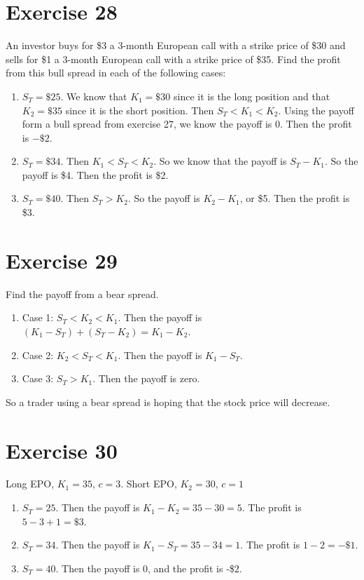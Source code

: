 \documentclass{article}
\begin{document}
\section*{Exercise 28} 
An investor buys for \$3 a 3-month European call with a strike price of \$30 and sells for \$1 a 3-month
European call with a strike price of \$35. Find the profit from this bull spread in each of the following cases:
\begin{enumerate}
    \item $S_T = \$25$. We know that $K_1 = \$30$ since it is the long position and that $K_2 = \$35$ since it is the short position.
    Then $S_T < K_1 < K_2$. Using the payoff form a bull spread from exercise 27, we know the payoff is 0. Then the profit is $-\$2$.
    \item $S_T = \$34$. Then $K_1 < S_T < K_2$. So we know that the payoff is $S_T - K_1$. So the payoff is \$4. Then the profit is \$2.
    \item $S_T = \$40$. Then $S_T > K_2$. So the payoff is $K_2 - K_1$, or \$5. Then the profit is \$3. 
\end{enumerate}

\section*{Exercise 29}
Find the payoff from a bear spread.
\begin{enumerate}
    \item Case 1: $S_T < K_2 < K_1$. Then the payoff is $(K_1 - S_T) + (S_T - K_2) = K_1 - K_2$.
    \item Case 2: $K_2 < S_T < K_1$. Then the payoff is $K_1 - S_T$.
    \item Case 3: $S_T > K_1$. Then the payoff is zero.
\end{enumerate}
So a trader using a bear spread is hoping that the stock price will decrease.

\section*{Exercise 30}
Long EPO, $K_1 = 35$, $c=3$. Short EPO, $K_2 =30$, $c=1$
\begin{enumerate}
    \item $S_T = 25$. Then the payoff is $K_1 - K_2 = 35-30 = 5$. The profit is $5 - 3 + 1 = \$3$.
    \item $S_T = 34$. Then the payoff is $K_1 - S_T = 35-34 = 1$. The profit is $1 - 2 = -\$1$.
    \item $S_T = 40$. Then the payoff is 0, and the profit is -\$2.
\end{enumerate}
\end{document}
